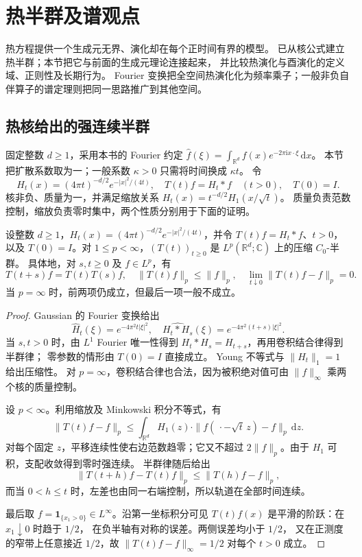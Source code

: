 \section{热半群及谱观点}

\label{b2:sec:app-D-4}

热方程提供一个生成元无界、演化却在每个正时间有界的模型。
已从核公式建立热半群；本节把它与前面的生成元理论连接起来，
并比较热演化与酉演化的定义域、正则性及长期行为。
Fourier 变换把全空间热演化化为频率乘子；一般非负自伴算子的谱定理则把同一思路推广到其他空间。

\subsection{热核给出的强连续半群}
\label{b2:subsec:D-heat-c0}

固定整数 \(d\ge1\)，采用本书的 Fourier 约定
\(\widehat f(\xi)=\int_{\mathbb R^d}f(x)e^{-2\pi\mathrm i x\cdot\xi}\,\mathrm dx\)。
本节把扩散系数取为一；一般系数 \(\kappa>0\) 只需将时间换成 \(\kappa t\)。
令
\[
 H_t(x)=(4\pi t)^{-d/2}e^{-|x|^2/(4t)},
 \quad T(t)f=H_t*f\quad(t>0),
 \quad T(0)=I.
\]
核非负、质量为一，并满足缩放关系
\(H_t(x)=t^{-d/2}H_1(x/\sqrt t)\)。
质量负责范数控制，缩放负责零时集中，两个性质分别用于下面的证明。

\begin{proposition}[全空间热半群]\label{b2:prop:D-heat-c0}
设整数 \(d\ge1\)，\(H_t(x)=(4\pi t)^{-d/2}e^{-|x|^2/(4t)}\)，并令 \(T(t)f=H_t*f\)、\(t>0\)，以及 \(T(0)=I\)。对 \(1\le p<\infty\)，\((T(t))_{t\ge0}\) 是
\(L^p(\mathbb R^d;\mathbb C)\) 上的压缩 \(C_0\)-半群。
具体地，对 \(s,t\ge0\) 及 \(f\in L^p\)，有
\[
 T(t+s)f=T(t)T(s)f,
 \quad \|T(t)f\|_p\le\|f\|_p,
 \quad \lim_{t\downarrow0}\|T(t)f-f\|_p=0.
\]
当 \(p=\infty\) 时，前两项仍成立，但最后一项一般不成立。
\end{proposition}
\begin{proof}
Gaussian 的 Fourier 变换给出
\[
 \widehat H_t(\xi)=e^{-4\pi^2t|\xi|^2},
 \quad \widehat{H_t*H_s}(\xi)
 =e^{-4\pi^2(t+s)|\xi|^2}.
\]
当 \(s,t>0\) 时，由 \(L^1\) Fourier 唯一性得到
\(H_t*H_s=H_{t+s}\)，再用卷积结合律得到半群律；
零参数的情形由 \(T(0)=I\) 直接成立。
Young 不等式与 \(\|H_t\|_1=1\) 给出压缩性。
对 \(p=\infty\)，卷积结合律也合法，因为被积绝对值可由
\(\|f\|_\infty\) 乘两个核的质量控制。

设 \(p<\infty\)。利用缩放及 Minkowski 积分不等式，有
\[
 \|T(t)f-f\|_p
 \le\int_{\mathbb R^d}H_1(z)
       \cdot\|f(\,\cdot-\sqrt t\,z)-f\|_p\,\mathrm dz.
\]
对每个固定 \(z\)，平移连续性使右边范数趋零；它又不超过
\(2\|f\|_p\)。由于 \(H_1\) 可积，支配收敛得到零时强连续。
半群律随后给出
\[
 \|T(t+h)f-T(t)f\|_p\le\|T(h)f-f\|_p,
\]
而当 \(0<h\le t\) 时，左差也由同一右端控制，所以轨道在全部时间连续。

最后取 \(f=\mathbf1_{\{x_1>0\}}\in L^\infty\)。沿第一坐标积分可见
\(T(t)f(x)\) 是平滑的阶跃：在 \(x_1\downarrow0\) 时趋于 \(1/2\)，
在负半轴有对称的误差。两侧误差均小于 \(1/2\)，
又在正测度的窄带上任意接近 \(1/2\)，故
\(\|T(t)f-f\|_\infty=1/2\) 对每个 \(t>0\) 成立。
\end{proof}

